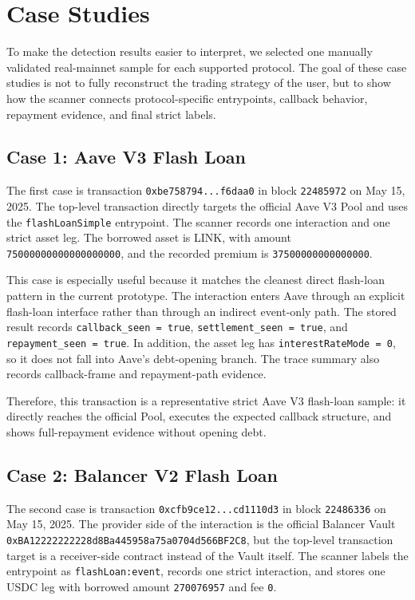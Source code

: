 \section{Case Studies}

To make the detection results easier to interpret, we selected one manually validated real-mainnet sample for each supported protocol. The goal of these case studies is not to fully reconstruct the trading strategy of the user, but to show how the scanner connects protocol-specific entrypoints, callback behavior, repayment evidence, and final strict labels.

\subsection{Case 1: Aave V3 Flash Loan}

The first case is transaction \texttt{0xbe758794...f6daa0} in block \texttt{22485972} on May 15, 2025. The top-level transaction directly targets the official Aave V3 Pool and uses the \texttt{flashLoanSimple} entrypoint. The scanner records one interaction and one strict asset leg. The borrowed asset is LINK, with amount \texttt{75000000000000000000}, and the recorded premium is \texttt{37500000000000000}.

This case is especially useful because it matches the cleanest direct flash-loan pattern in the current prototype. The interaction enters Aave through an explicit flash-loan interface rather than through an indirect event-only path. The stored result records \texttt{callback\_seen = true}, \texttt{settlement\_seen = true}, and \texttt{repayment\_seen = true}. In addition, the asset leg has \texttt{interestRateMode = 0}, so it does not fall into Aave's debt-opening branch. The trace summary also records callback-frame and repayment-path evidence.

Therefore, this transaction is a representative strict Aave V3 flash-loan sample: it directly reaches the official Pool, executes the expected callback structure, and shows full-repayment evidence without opening debt.

\subsection{Case 2: Balancer V2 Flash Loan}

The second case is transaction \texttt{0xcfb9ce12...cd1110d3} in block \texttt{22486336} on May 15, 2025. The provider side of the interaction is the official Balancer Vault \texttt{0xBA12222222228d8Ba445958a75a0704d566BF2C8}, but the top-level transaction target is a receiver-side contract instead of the Vault itself. The scanner labels the entrypoint as \texttt{flashLoan:event}, records one strict interaction, and stores one USDC leg with borrowed amount \texttt{270076957} and fee \texttt{0}.

